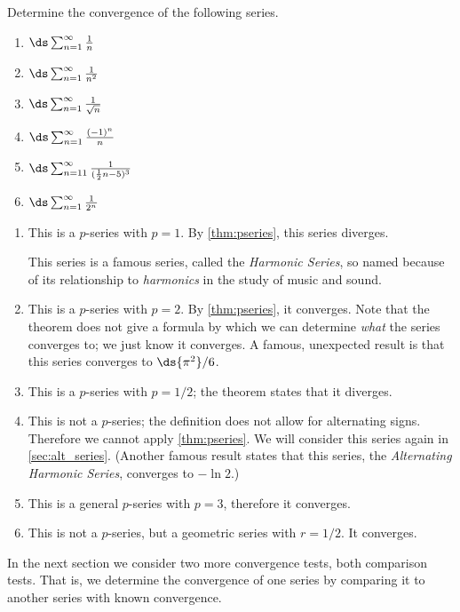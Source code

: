 \begin{example}\label{ex_series6}%
Determine the convergence of the following series.
\begin{multicols}{3}
\begin{enumerate}
\item		$\ds\sum_{n=1}^\infty \frac{1}{n}$
\item		$\ds\sum_{n=1}^\infty \frac{1}{n^2}$
\item		$\ds\sum_{n=1}^\infty \frac{1}{\sqrt{n}}$
\item		$\ds\sum_{n=1}^\infty \frac{(-1)^n}{n}$
\item		$\ds\sum_{n=11}^\infty \frac{1}{(\frac12n-5)^3}$
\item		$\ds\sum_{n=1}^\infty \frac{1}{2^n}$
\end{enumerate}
\end{multicols}
\solution
\begin{enumerate}
\item	This is a $p$-series with $p=1$. By \autoref{thm:pseries}, this series diverges.

This series is a famous series, called the \emph{Harmonic Series}, so named because of its relationship to \emph{harmonics} in the study of music and sound. 

\item	This is a $p$-series with $p=2$. By \autoref{thm:pseries}, it converges. Note that the theorem does not give a formula by which we can determine \emph{what} the series converges to; we just know it converges. A famous, unexpected result is that this series converges to $\ds{\pi^2}/{6}$.

\item	This is a $p$-series with $p=1/2$; the theorem states that it diverges.

\item	This is not a $p$-series; the definition does not allow for alternating signs. Therefore we cannot apply \autoref{thm:pseries}. We will consider this series again in \autoref{sec:alt_series}.
(Another famous result states that this series, the \emph{Alternating Harmonic Series}, converges to $-\ln 2$.)

\item	This is a general $p$-series with $p=3$, therefore it converges.

\item	This is not a $p$-series, but a geometric series with $r=1/2$. It converges.
\end{enumerate}
\end{example}

In the next section we consider two more convergence tests, both comparison tests. That is, we determine the convergence of one series by  comparing it to another series with known convergence. 

